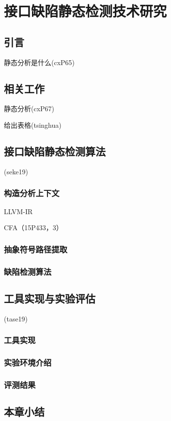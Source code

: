 \chapter{接口缺陷静态检测技术研究}
\label{cha:imchecker}

\section{引言}
静态分析是什么(cxP65)
\section{相关工作}
静态分析(cxP67)


给出表格(tsinghua)






\section{接口缺陷静态检测算法}
(seke19)
\subsection{构造分析上下文}
LLVM-IR

CFA（15P433，3）

\subsection{抽象符号路径提取}
\subsection{缺陷检测算法}

\section{工具实现与实验评估}
(tase19)
\subsection{工具实现}
\subsection{实验环境介绍}
\subsection{评测结果}

\section{本章小结}
